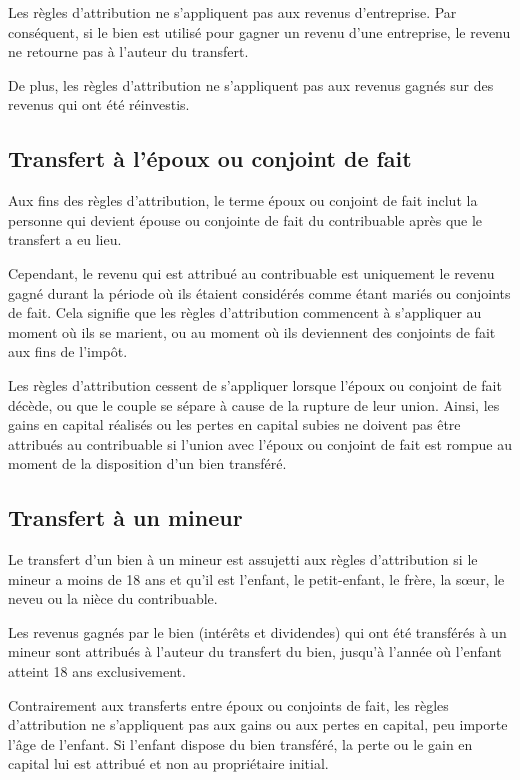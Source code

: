 Les règles d'attribution ne s'appliquent pas aux revenus d'entreprise. Par conséquent, si le bien est utilisé pour gagner un revenu d'une entreprise, le revenu ne retourne pas à l'auteur du transfert.

De plus, les règles d'attribution ne s'appliquent pas aux revenus gagnés sur des revenus qui ont été réinvestis.


\subsection{Transfert à l'époux ou conjoint de fait}
Aux fins des règles d'attribution, le terme \og époux ou conjoint de fait \fg{} inclut la personne qui devient épouse ou conjointe de fait du contribuable après que le transfert a eu lieu. 

Cependant, le revenu qui est attribué au contribuable est uniquement le revenu gagné durant la période où ils étaient considérés comme étant mariés ou conjoints de fait. Cela signifie que les règles d'attribution commencent à s'appliquer au moment où ils se marient, ou au moment où ils deviennent des conjoints de fait aux fins de l'impôt.

Les règles d'attribution cessent de s'appliquer lorsque l'époux ou conjoint de fait décède, ou que le couple se sépare à cause de la rupture de leur union. Ainsi, les gains en capital réalisés ou les pertes en capital subies ne doivent pas être attribués au contribuable si l'union avec l'époux ou conjoint de fait est rompue au moment de la disposition d'un bien transféré.


\subsection{Transfert à un mineur}
Le transfert d'un bien à un mineur est assujetti aux règles d'attribution si le mineur a moins de 18 ans et qu'il est l'enfant, le petit-enfant, le frère, la sœur, le neveu ou la nièce du contribuable. 

Les revenus gagnés par le bien (intérêts et dividendes) qui ont été transférés à un mineur sont attribués à l'auteur du transfert du bien, jusqu'à l'année où l'enfant atteint 18 ans exclusivement. 

Contrairement aux transferts entre époux ou conjoints de fait, les règles d'attribution ne s'appliquent pas aux gains ou aux pertes en capital, peu importe l'âge de l'enfant. Si l'enfant dispose du bien transféré, la perte ou le gain en capital lui est attribué et non au propriétaire initial.


